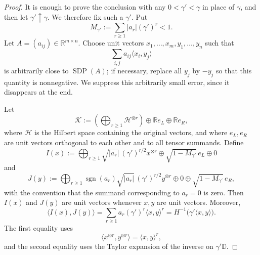 \begin{proof}
It is enough to prove the conclusion with any \(0<\gamma'<\gamma\) in
place of \(\gamma\), and then let \(\gamma'\uparrow\gamma\). We therefore
fix such a \(\gamma'\). Put
\[
    M_{\gamma'}:=\sum_{r\ge 1}|a_r|(\gamma')^r < 1.
\]
Let \(A=(a_{ij})\in\mathbb R^{m\times n}\). Choose unit vectors
\(x_1,\ldots,x_m,y_1,\ldots,y_n\) such that
\[
    \sum_{i,j} a_{ij}\langle x_i,y_j\rangle
\]
is arbitrarily close to \(\operatorname{SDP}(A)\); if necessary, replace all
\(y_j\) by \(-y_j\) so that this quantity is nonnegative. We suppress this
arbitrarily small error, since it disappears at the end.

Let
\[
    \mathcal K
    :=
    \left(\bigoplus_{r\ge 1} \mathcal H^{\otimes r}\right)
    \oplus \mathbb R e_L\oplus \mathbb R e_R,
\]
where \(\mathcal H\) is the Hilbert space containing the original vectors,
and where \(e_L,e_R\) are unit vectors orthogonal to each other and to all
tensor summands. Define
\[
    I(x)
    :=
    \bigoplus_{r\ge 1}
        \sqrt{|a_r|}\,(\gamma')^{r/2}x^{\otimes r}
    \oplus \sqrt{1-M_{\gamma'}}\,e_L
    \oplus 0
\]
and
\[
    J(y)
    :=
    \bigoplus_{r\ge 1}
        \operatorname{sgn}(a_r)\sqrt{|a_r|}\,(\gamma')^{r/2}y^{\otimes r}
    \oplus 0
    \oplus \sqrt{1-M_{\gamma'}}\,e_R,
\]
with the convention that the summand corresponding to \(a_r=0\) is zero.
Then \(I(x)\) and \(J(y)\) are unit vectors whenever \(x,y\) are unit
vectors. Moreover,
\[
    \langle I(x),J(y)\rangle
    =
    \sum_{r\ge 1} a_r(\gamma')^r\langle x,y\rangle^r
    =
    H^{-1}\bigl(\gamma'\langle x,y\rangle\bigr).
\]
The first equality uses
\[
    \langle x^{\otimes r},y^{\otimes r}\rangle
    =
    \langle x,y\rangle^r,
\]
and the second equality uses the Taylor expansion of the inverse on
\(\gamma'\mathbb D\).


\end{proof}
